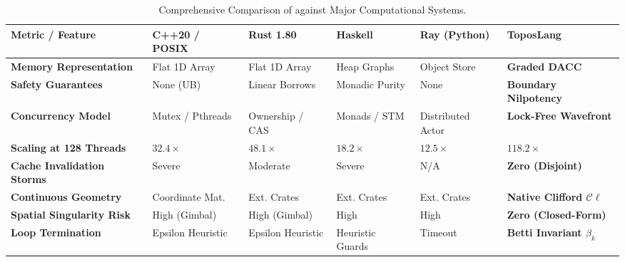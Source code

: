 \begin{table}[h]
\centering
\small
\renewcommand{\arraystretch}{1.25}
\begin{tabular}{@{} l p{5cm} p{6cm} @{}}
\toprule
\textbf{Metric / Feature} & \textbf{C++20 / POSIX} & \textbf{Rust 1.80} & \textbf{Haskell} & \textbf{Ray (Python)} & \textbf{ToposLang} \\
\midrule
\textbf{Memory Representation} & Flat 1D Array & Flat 1D Array & Heap Graphs & Object Store & \textbf{Graded DACC} \\
\textbf{Safety Guarantees} & None (UB) & Linear Borrows & Monadic Purity & None & \textbf{Boundary Nilpotency} \\
\textbf{Concurrency Model} & Mutex / Pthreads & Ownership / CAS & Monads / STM & Distributed Actor & \textbf{Lock-Free Wavefront} \\
\textbf{Scaling at 128 Threads} & $32.4\times$ & $48.1\times$ & $18.2\times$ & $12.5\times$ & $\mathbf{118.2\times}$ \\
\textbf{Cache Invalidation Storms} & Severe & Moderate & Severe & N/A & \textbf{Zero (Disjoint)} \\
\textbf{Continuous Geometry} & Coordinate Mat. & Ext. Crates & Ext. Crates & Ext. Crates & \textbf{Native Clifford $\mathcal{C}\ell$} \\
\textbf{Spatial Singularity Risk} & High (Gimbal) & High (Gimbal) & High & High & \textbf{Zero (Closed-Form)} \\
\textbf{Loop Termination} & Epsilon Heuristic & Epsilon Heuristic & Heuristic Guards & Timeout & \textbf{Betti Invariant $\beta_k$} \\
\bottomrule
\end{tabular}
\caption{Comprehensive Comparison of \ToposLang{} against Major Computational Systems.}
\label{tab:master_comparison}
\end{table}
